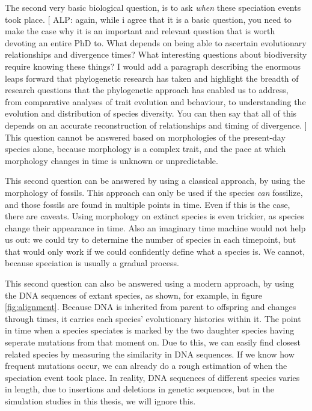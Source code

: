 The second very basic biological question, is to 
ask \emph{when} these speciation events took place.
[
  ALP:
  again, while i agree that it is a basic question, 
  you need to make the case why it is an important and relevant question 
  that is worth devoting an entire PhD to. 
  What depends on being able to ascertain 
  evolutionary relationships and divergence times? 
  What interesting questions about biodiversity require knowing these things?
  I would add a paragraph describing the enormous leaps 
  forward that phylogenetic research has taken and highlight 
  the breadth of research questions that the phylogenetic approach 
  has enabled us to address, from comparative analyses 
  of trait evolution and behaviour, to understanding 
  the evolution and distribution of species diversity. 
  You can then say that all of this depends on an accurate reconstruction 
  of relationships and timing of divergence.
]
This question cannot be answered based on morphologies of the present-day
species alone, because morphology is a complex trait, and the pace at
which morphology changes in time is unknown or unpredictable.

This second question can be answered by
using a classical approach, 
by using the morphology of fossils.
This approach can only be used if the species \emph{can} fossilize,
and those fossils are found in multiple points in time.
Even if this is the case, there are caveats. Using morphology on
extinct species is even trickier, as species change their appearance in time.
Also an imaginary time machine would not help us out:
we could try to determine the number of species in each timepoint,
but that would only work if we could confidently define what a
species is. We cannot, because speciation is usually a gradual process.

This second question can also be answered 
using a modern approach, 
by using the DNA sequences of extant species,
as shown, for example, in figure \ref{fig:alignment}.
Because DNA is inherited from parent to offspring
and changes through times, it carries each species' 
evolutionary histories within it.
The point in time when a species speciates is
marked by the two daughter species having seperate mutations
from that moment on.
Due to this, we can easily find closest related species 
by measuring the similarity in DNA sequences.
If we know how frequent mutations occur, we can already
do a rough estimation of when the speciation event took place.
In reality, DNA sequences of different species 
varies in length, due to insertions and deletions in genetic sequences,
but in the simulation studies in this thesis, we will ignore this.

